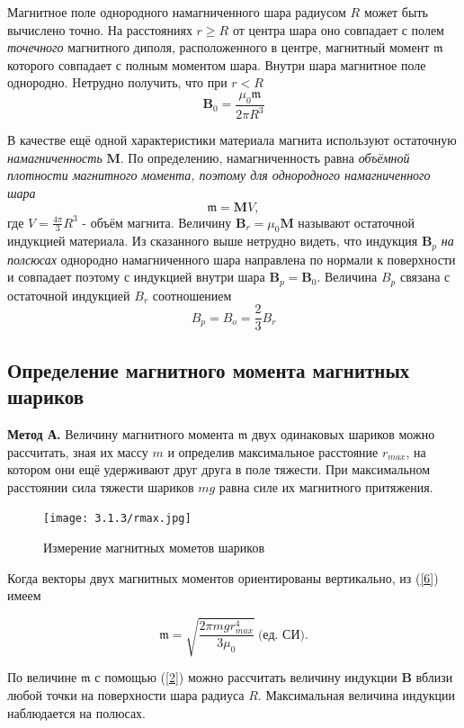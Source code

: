 \documentclass[a4paper,12pt]{article} %
\begin{document}
Магнитное поле однородного намагниченного шара радиусом $R$ может быть вычислено точно. На расстояниях $r \geq R$ от центра шара оно совпадает с полем \textit{точечного} магнитного диполя, расположенного в центре, магнитный момент $\mathfrak{m}$ которого совпадает с полным моментом шара. Внутри шара магнитное поле однородно. Hетрудно получить, что при $r < R$ \[\textbf{B}_{0} = \frac{\mu_0 \mathfrak{m}}{2\pi R^3}\]

В качестве ещё одной характеристики материала магнита используют остаточную \textit{намагниченность} $\textbf{M}$. По определению, намагниченность равна \textit{объёмной плотности магнитного момента, поэтому для однородного намагниченного шара} $$\mathfrak{m}= \textbf{M}V ,$$ где $\displaystyle V = \frac{4\pi}{3}R^3$ - объём магнита. Величину $\textbf{B}_r = \mu_0 \textbf{M}$ называют остаточной индукцией материала.
Из сказанного выше нетрудно видеть, что индукция $\textbf{B}_p$ \textit{на полсюсах} однородно намагниченного шара направлена по нормали к поверхности и совпадает поэтому с индукцией внутри шара $\textbf{B}_p = \textbf{B}_0$. Величина $B_p$ связана с остаточной индукцией $B_r$ соотношением \[B_p = B_o = \frac{2}{3}B_r \]


\subsection{Определение магнитного момента магнитных шариков}

\textbf{Метод А.} Величину магнитного момента $\mathfrak{m}$ двух одинаковых шариков можно рассчитать, зная их массу $m$ и определив максимальное расстояние $r_{max}$, на котором они ещё удерживают друг друга в поле тяжести. При максимальном расстоянии сила тяжести шариков $mg$ равна силе их магнитного притяжения. 

\begin{figure}
\begin{center}
    \texttt{[image: 3.1.3/rmax.jpg]}
    \caption{Измерение магнитных мометов шариков}
\end{center}
\end{figure}

Когда векторы двух магнитных моментов ориентированы вертикально, из (\ref{6}) имеем

\begin{equation*}
    \mathfrak{m} = \sqrt{\frac{2\pi mgr^4_{max}}{3 \mu_0}} \ \text{(ед. СИ).}
\end{equation*}

По величине $\mathfrak{m}$ с помощью (\ref{2}) можно рассчитать величину индукции $\textbf{B}$ вблизи любой точки на поверхности шара радиуса $R$. Максимальная величина индукции наблюдается на полюсах.
\end{document}
